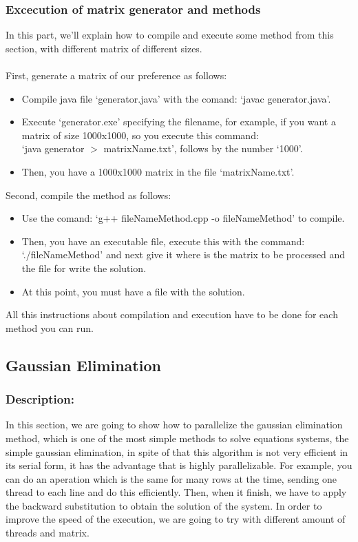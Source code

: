\documentclass{article}
\begin{document}
\subsubsection{Excecution of matrix generator and methods}
In this part, we'll explain how to compile and execute some method from this section, with different matrix of different sizes.\\\\
First, generate a matrix of our preference as follows:
\begin{itemize}
\item Compile java file `generator.java' with the comand: `javac generator.java'.
\item Execute `generator.exe' specifying the filename, for example, if you want a matrix of size 1000x1000, so you execute this command: \\
`java generator $>$ matrixName.txt', follows by the number `1000'.
\item Then, you have a 1000x1000 matrix in the file `matrixName.txt'.
\end{itemize}
Second, compile the method as follows:
\begin{itemize}
\item Use the comand: `g++ fileNameMethod.cpp -o fileNameMethod' to compile.
\item Then, you have an executable file, execute this with the command: \\
`./fileNameMethod' and next give it where is the matrix to be processed and the file for write the solution.
\item At this point, you must have a file with the solution.
\end{itemize}

All this instructions about compilation and execution have to be done for each method you can run.


\subsection{Gaussian Elimination}

\subsubsection{Description:}

In this section, we are going to show how to parallelize the gaussian elimination method, which is one of the most simple methods to solve equations systems, the simple gaussian elimination, in spite of that this algorithm is not very efficient in its serial form, it has the advantage that is highly parallelizable. For example, you can do an aperation which is the same for many rows at the time, sending one thread to each line and do this efficiently. Then, when it finish, we have to apply the backward substitution to obtain the solution of the system. In order to improve the speed of the execution, we are going to try with different amount of threads and matrix.
\end{document}
